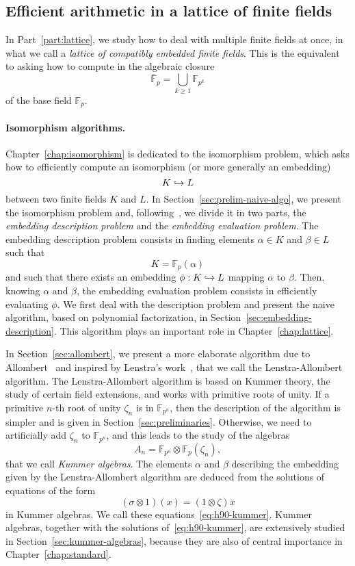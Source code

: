 \subsection{Efficient arithmetic in a lattice of finite fields}
In Part~\ref{part:lattice}, we study how to deal with multiple finite fields
at once, in what we call a \emph{lattice of compatibly embedded finite fields}.
This is the equivalent to asking how to compute in the algebraic closure
\[
  \bar{\mathbb{F}}_{p} = \bigcup_{k\geq1}\mathbb{F}_{p^k}
\]
of the base field $\mathbb{F}_p$.

\paragraph{Isomorphism algorithms.}
Chapter~\ref{chap:isomorphism} is dedicated to the isomorphism problem, which
asks how to efficiently compute an isomorphism (or more generally an embedding)
\[
  K \hookrightarrow L
\]
between two finite fields $K$ and $L$. In Section~\ref{sec:prelim-naive-algo},
we present the isomorphism problem and, following~\cite{BDDFS17}, we divide it
in two parts, the \emph{embedding description problem} and the \emph{embedding
evaluation problem}. The embedding description problem consists in finding
elements $\alpha\in K$ and $\beta\in L$ such that
\[
  K = \mathbb{F}_{p}(\alpha)
\]
and such that there exists an embedding $\phi:K\hookrightarrow L$ mapping $\alpha$ to
$\beta$. Then, knowing $\alpha$ and $\beta$, the embedding evaluation problem
consists in efficiently evaluating $\phi$. We first deal with the description
problem and present the naive algorithm, based on polynomial factorization, in
Section~\ref{sec:embedding-description}. This algorithm plays an important role
in Chapter~\ref{chap:lattice}.

In Section~\ref{sec:allombert}, we present a more elaborate algorithm due to
Allombert~\cite{Allombert02} and inspired by Lenstra's work~\cite{Lenstra91},
that we call the Lenstra-Allombert algorithm. The Lenstra-Allombert algorithm is
based on Kummer theory, the study of certain field extensions, and works with
primitive roots of unity. If a primitive $n$-th root of unity $\zeta_n$ is in
$\mathbb{F}_{p^n}$, then the description of the algorithm is simpler and is
given in Section~\ref{sec:preliminaries}. Otherwise, we need to artificially add
$\zeta_n$ to $\mathbb{F}_{p^n}$, and this leads to the study of the algebras
\[
  A_n = \mathbb{F}_{p^{n}}\otimes\mathbb{F}_{p}(\zeta_n),
\]
that we call \emph{Kummer algebras}. The elements $\alpha$ and $\beta$
describing the embedding given by the Lenstra-Allombert algorithm are deduced
from the solutions of equations of the form
\[
  (\sigma\otimes 1)(x) = (1\otimes\zeta)x
\]
in Kummer algebras. We call these equations~\eqref{eq:h90-kummer}.
Kummer algebras, together with the solutions of~\eqref{eq:h90-kummer}, are
extensively studied in Section~\ref{sec:kummer-algebras}, because they are also
of central importance in Chapter~\ref{chap:standard}.

